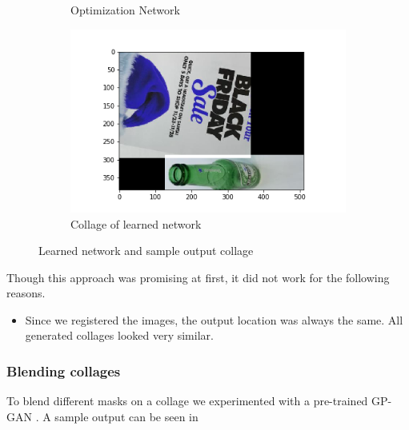 \documentclass{article}
\begin{document}
\begin{figure}
\begin{subfigure}{0.2\linewidth}
     \caption{Optimization Network}
  \end{subfigure}
  \begin{subfigure}{0.7\linewidth}
    \includegraphics[width=\linewidth]{data/images/04_Learned_Collage/collage_optimization_output.png}
    \caption{Collage of learned network}
  \end{subfigure}
    \label{fig:learned_collage_output}
    \caption{Learned network and sample output collage}
\end{figure}

Though this approach was promising at first, it did not work for the following reasons. 

\begin{itemize}
    \item Since we registered the images, the output location was always the same. All generated collages looked very similar. 
\end{itemize}




\subsubsection{Blending collages}
To blend different masks on a collage we experimented with a pre-trained GP-GAN \cite{wu2019gp}. A sample output can be seen in \pageref{fig:GAN_Blending}
\end{document}
